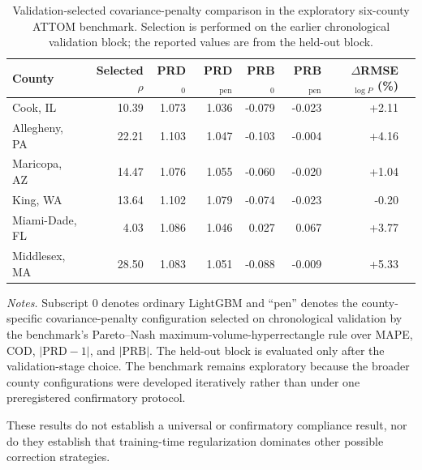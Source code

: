 \documentclass[10pt]{article}
\theoremstyle{definition}
\newcommand{\1}{\mathbf{1}}
\newcommand{\oldtext}[1]{\textcolor{blue}{\sout{#1}}}
\newcommand{\newtext}[1]{\textcolor{impGreen}{#1}}
\begin{document}
{\color{impGreen}
\begin{table}[!htbp]
\centering
\scriptsize
\setlength{\tabcolsep}{4.0pt}
\renewcommand{\arraystretch}{1.06}
\caption{Validation-selected covariance-penalty comparison in the exploratory six-county ATTOM benchmark. Selection is performed on the earlier chronological validation block; the reported values are from the held-out block.}
\label{tab:attom_selected_penalty}
\begin{tabular}{lrrrrrrr}
\toprule
County & Selected $\rho$ & PRD$_0$ & PRD$_{\mathrm{pen}}$ & PRB$_0$ & PRB$_{\mathrm{pen}}$ & $\Delta$RMSE$_{\log P}$ (\%) \\
\midrule
Cook, IL & 10.39 & 1.073 & 1.036 & -0.079 & -0.023 & +2.11 \\
Allegheny, PA & 22.21 & 1.103 & 1.047 & -0.103 & -0.004 & +4.16 \\
Maricopa, AZ & 14.47 & 1.076 & 1.055 & -0.060 & -0.020 & +1.04 \\
King, WA & 13.64 & 1.102 & 1.079 & -0.074 & -0.023 & -0.20 \\
Miami-Dade, FL & 4.03 & 1.086 & 1.046 & 0.027 & 0.067 & +3.77 \\
Middlesex, MA & 28.50 & 1.083 & 1.051 & -0.088 & -0.009 & +5.33 \\
\bottomrule
\end{tabular}
\vspace{1mm}
\begin{minipage}{0.98\textwidth}
\scriptsize
\emph{Notes.} Subscript $0$ denotes ordinary LightGBM and ``pen'' denotes the county-specific covariance-penalty configuration selected on chronological validation by the benchmark's Pareto--Nash maximum-volume-hyperrectangle rule over MAPE, COD, $|\mathrm{PRD}-1|$, and $|\mathrm{PRB}|$. The held-out block is evaluated only after the validation-stage choice. The benchmark remains exploratory because the broader county configurations were developed iteratively rather than under one preregistered confirmatory protocol.
\end{minipage}
\end{table}
}

\newtext{These results do not establish a universal or confirmatory compliance result, nor do they establish that training-time regularization dominates other possible correction strategies.}
\end{document}
